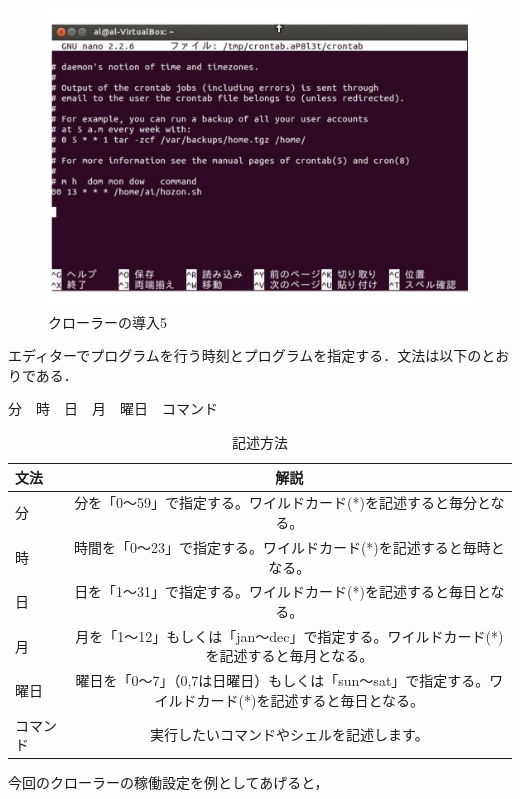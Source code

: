 \begin{figure}[H]
\centering
\includegraphics[width=13cm]{figure7.pdf}
\caption{クローラーの導入5}\label{sannp}
\end{figure}

エディターでプログラムを行う時刻とプログラムを指定する．文法は以下のとおりである．

分　時　日　月　曜日　コマンド

\begin{table}[H]
  \begin{center}
    \caption{記述方法}
    \begin{tabular}{|l|c|} \hline
      文法 & 解説  \\ \hline
分　& 分を「0～59」で指定する。ワイルドカード(*)を記述すると毎分となる。 \\
時 & 時間を「0～23」で指定する。ワイルドカード(*)を記述すると毎時となる。 \\
日 & 日を「1～31」で指定する。ワイルドカード(*)を記述すると毎日となる。 \\
月 & 月を「1～12」もしくは「jan～dec」で指定する。ワイルドカード(*)を記述すると毎月となる。 \\
曜日 & 曜日を「0～7」（0,7は日曜日）もしくは「sun～sat」で指定する。ワイルドカード(*)を記述すると毎日となる。 \\
コマンド & 実行したいコマンドやシェルを記述します。 \\ \hline
    \end{tabular}
  \end{center}
\end{table}

今回のクローラーの稼働設定を例としてあげると，

